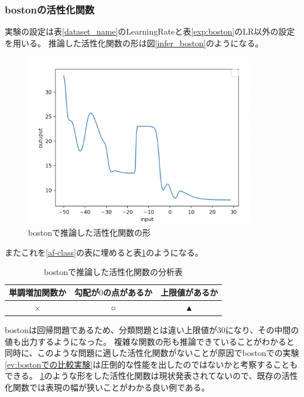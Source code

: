 \subsubsection{bostonの活性化関数}
実験の設定は表\ref{dataset_name}のLearningRateと表\ref{exp:boston}のLR以外の設定を用いる。
推論した活性化関数の形は図\ref{infer_boston}のようになる。
\begin{figure}[hbtp]
    \begin{center}
        \includegraphics[width=10cm]{asset/boston-0.00001.png}
            \caption{bostonで推論した活性化関数の形}
            \label{ifer_boston}
    \end{center}
\end{figure}

またこれを\ref{af-class}の表に埋めると表\ref{anal_boston}のようになる。
\begin{table}[htbp]
    \begin{center}
        \caption{bostonで推論した活性化関数の分析表}
        \label{anal_boston}
        \vspace{2mm} 
        \begin{tabular}{ |c|c|c| }
        単調増加関数か & 勾配が$ 0 $の点があるか & 上限値があるか   \\
        \hline
        × & ○ & ▲   \\
        \end{tabular}
    \end{center}
\end{table}


bostonは回帰問題であるため、分類問題とは違い上限値が30になり、その中間の値も出力するようになった。
複雑な関数の形も推論できていることがわかると同時に、このような問題に適した活性化関数がないことが原因でbostonでの実験\ref{ev:bostonでの比較実験}は圧倒的な性能を出したのではないかと考察することもできる。
\ref{ifer_boston}のような形をした活性化関数は現状発表されてないので、既存の活性化関数では表現の幅が狭いことがわかる良い例である。





